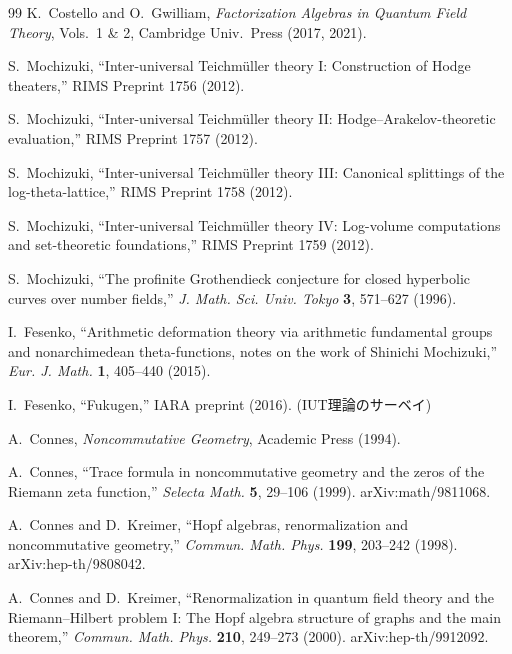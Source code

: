\documentclass[12pt,a4paper]{ltjsarticle}
\theoremstyle{definition}
\begin{document}
\begin{thebibliography}{99}
K.~Costello and O.~Gwilliam, \textit{Factorization Algebras in Quantum Field Theory}, Vols.~1 \& 2, Cambridge Univ.~Press (2017, 2021).

S.~Mochizuki, ``Inter-universal Teichm\"{u}ller theory I: Construction of Hodge theaters,'' RIMS Preprint 1756 (2012).

S.~Mochizuki, ``Inter-universal Teichm\"{u}ller theory II: Hodge--Arakelov-theoretic evaluation,'' RIMS Preprint 1757 (2012).

S.~Mochizuki, ``Inter-universal Teichm\"{u}ller theory III: Canonical splittings of the log-theta-lattice,'' RIMS Preprint 1758 (2012).

S.~Mochizuki, ``Inter-universal Teichm\"{u}ller theory IV: Log-volume computations and set-theoretic foundations,'' RIMS Preprint 1759 (2012).

S.~Mochizuki, ``The profinite Grothendieck conjecture for closed hyperbolic curves over number fields,'' \textit{J. Math. Sci. Univ. Tokyo} \textbf{3}, 571--627 (1996).

I.~Fesenko, ``Arithmetic deformation theory via arithmetic fundamental groups and nonarchimedean theta-functions, notes on the work of Shinichi Mochizuki,'' \textit{Eur. J. Math.} \textbf{1}, 405--440 (2015).

I.~Fesenko, ``Fukugen,'' IARA preprint (2016). (IUT理論のサーベイ)

A.~Connes, \textit{Noncommutative Geometry}, Academic Press (1994).

A.~Connes, ``Trace formula in noncommutative geometry and the zeros of the Riemann zeta function,'' \textit{Selecta Math.} \textbf{5}, 29--106 (1999). arXiv:math/9811068.

A.~Connes and D.~Kreimer, ``Hopf algebras, renormalization and noncommutative geometry,'' \textit{Commun. Math. Phys.} \textbf{199}, 203--242 (1998). arXiv:hep-th/9808042.

A.~Connes and D.~Kreimer, ``Renormalization in quantum field theory and the Riemann--Hilbert problem I: The Hopf algebra structure of graphs and the main theorem,'' \textit{Commun. Math. Phys.} \textbf{210}, 249--273 (2000). arXiv:hep-th/9912092.


\end{thebibliography}
\end{document}
